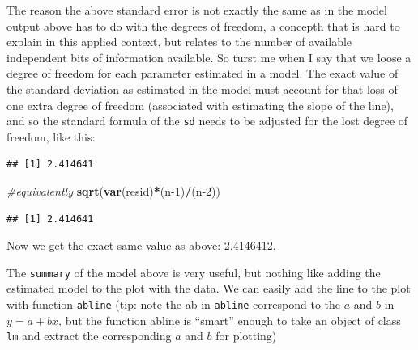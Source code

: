 \documentclass[
]{book}
\newenvironment{Shaded}{\begin{snugshade}}{\end{snugshade}}
\newcommand{\CommentTok}[1]{\textcolor[rgb]{0.56,0.35,0.01}{\textit{#1}}}
\newcommand{\DecValTok}[1]{\textcolor[rgb]{0.00,0.00,0.81}{#1}}
\newcommand{\KeywordTok}[1]{\textcolor[rgb]{0.13,0.29,0.53}{\textbf{#1}}}
\newcommand{\NormalTok}[1]{#1}
\newcommand{\OperatorTok}[1]{\textcolor[rgb]{0.81,0.36,0.00}{\textbf{#1}}}
\begin{document}
The reason the above standard error is not exactly the same as in the model output above has to do with the degrees of freedom, a concepth that is hard to explain in this applied context, but relates to the number of available independent bits of information available. So turst me when I say that we loose a degree of freedom for each parameter estimated in a model. The exact value of the standard deviation as estimated in the model must account for that loss of one extra degree of freedom (associated with estimating the slope of the line), and so the standard formula of the \texttt{sd} needs to be adjusted for the lost degree of freedom, like this:

\begin{Shaded}
\end{Shaded}

\begin{verbatim}
## [1] 2.414641
\end{verbatim}

\begin{Shaded}
\begin{Highlighting}[]
\CommentTok{#equivalently}
\KeywordTok{sqrt}\NormalTok{(}\KeywordTok{var}\NormalTok{(resid)}\OperatorTok{*}\NormalTok{(n}\DecValTok{-1}\NormalTok{)}\OperatorTok{/}\NormalTok{(n}\DecValTok{-2}\NormalTok{))}
\end{Highlighting}
\end{Shaded}

\begin{verbatim}
## [1] 2.414641
\end{verbatim}

Now we get the exact same value as above: 2.4146412.

The \texttt{summary} of the model above is very useful, but nothing like adding the estimated model to the plot with the data. We can easily add the line to the plot with function \texttt{abline} (tip: note the ab in \texttt{abline} correspond to the \(a\) and \(b\) in \(y=a+bx\), but the function abline is ``smart'' enough to take an object of class \texttt{lm} and extract the corresponding \(a\) and \(b\) for plotting)
\end{document}
